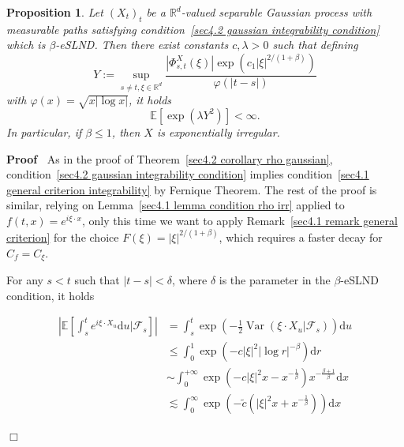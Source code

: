 \documentclass[10pt]{article}
\newcommand{\assign}{:=}
\newcommand{\mathd}{\mathrm{d}}
\newcommand{\nobracket}{}
\newcommand{\tmop}[1]{\ensuremath{\operatorname{#1}}}
\newenvironment{proof}{\noindent\textbf{Proof\ }}{\hspace*{\fill}$\Box$\medskip}
\newtheorem{proposition}[theorem]{Proposition}
{\theorembodyfont{\rmfamily}\newtheorem{remark}[theorem]{Remark}}
\begin{document}
\begin{proposition}
  \label{sec4.2 prop exp irr}Let $(X_t)_t$ be a $\mathbb{R}^d$-valued
  separable Gaussian process with measurable paths satisfying
  condition~{\eqref{sec4.2 gaussian integrability condition}} which is
  $\beta$\mbox{-}eSLND. Then there exist constants $c, \lambda > 0$ such that
  defining
  \[ Y \assign \sup_{s \neq t, \xi \in \mathbb{R}^d} \frac{| \Phi^X_{s, t}
     (\xi) | \exp (c_1 | \xi |^{2 / (1 + \beta)})}{\varphi (| t - s |)} \]
  with $\varphi (x) = \sqrt{x | \log x |}$, it holds
  \[ \mathbb{E} [\exp (\lambda Y^2)] < \infty . \]
  In particular, if $\beta \leqslant 1$, then $X$ is exponentially irregular.
\end{proposition}

\begin{proof}
  As in the proof of Theorem~\ref{sec4.2 corollary rho gaussian},
  condition~{\eqref{sec4.2 gaussian integrability condition}} implies
  condition~{\eqref{sec4.1 general criterion integrability}} by Fernique
  Theorem. The rest of the proof is similar, relying on Lemma~\ref{sec4.1
  lemma condition rho irr} applied to $f (t, x) = e^{i \xi \cdot x}$, only
  this time we want to apply Remark~\ref{sec4.1 remark general criterion} for
  the choice $F (\xi) = | \xi |^{2 / (1 + \beta)}$, which requires a faster
  decay for $C_f = C_{\xi}$.
  
  For any $s < t$ such that $| t - s | < \delta$, where $\delta$ is the
  parameter in the $\beta$\mbox{-}eSLND condition, it holds
  
  \begin{align*}
    \left| \mathbb{E} \left[ \int_s^t e^{i \xi \cdot X_u} \mathd u |
    \mathcal{F}_s \nobracket \right] \right| & = \int_s^t \exp \left( -
    \frac{1}{2} \tmop{Var} (\xi \cdot X_u | \mathcal{F}_s \nobracket) \right)
    \mathd u\\
    & \leqslant \int_0^1 \exp (- c | \xi |^2 | \log r |^{- \beta}) \mathd r\\
    & \sim \int_0^{+ \infty} \exp \left( - c | \xi |^2 x - x^{-
    \frac{1}{\beta}} \right) x^{- \frac{\beta + 1}{\beta}} \mathd x\\
    & \lesssim \int_0^{\infty} \exp \left( - \tilde{c} \left( | \xi |^2 x +
    x^{- \frac{1}{\beta}} \right) \right) \mathd x
  \end{align*}
  

\end{proof}
\end{document}
